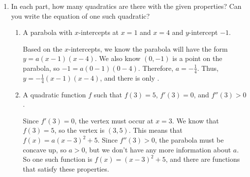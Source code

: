 \documentclass{article}
\begin{document}
\begin{enumerate}[resume]
\begin{enumerate}
    \begin{problem}[\stretch{0.35}]
      Can you rewrite $g(x)$ in the other 2 ways?
    \end{problem}

    \begin{solution}
      We can rewrite $g(x)$ in vertex form with 
      $a=-2$, $h=1$, and $k=-5$. So $g(x)=-2(x-1)^2-5$. However,
      we can see that the graph of $y=g(x)$ has no $x$-intercepts,
      which means that we cannot rewrite $g(x)$ in factored form
      using \textit{real numbers} $r_1$ and $r_2$. 
    \end{solution}
  \end{enumerate}


\item  In each part, how many quadratics are there with the given properties? Can you write the equation of one such quadratic?

  \begin{enumerate}
  \item


    \begin{problem}[\nstretch{0.65}]
      A parabola with $x$-intercepts at $x = 1$ and $x = 4$ and $y$-intercept $-1$. 
    \end{problem}

    \begin{solution}
      Based on the $x$-intercepts, we know the parabola will have the form $y = a (x - 1) (x - 4)$. We also know $(0, -1)$ is a point on the parabola, so $-1 = a (0-1)(0-4)$. Therefore, $a = - \frac{1}{4}$. Thus, $\boxed{y =  - \frac{1}{4} (x - 1) (x - 4)}$, and there is only .
    \end{solution}

  \item
    \begin{problem}[\vfill]
      A quadratic function $f$ such that $f(3) = 5$, $f'(3) = 0$, and $f''(3) > 0$. 
    \end{problem}

    \begin{solution}
      Since $f'(3)=0$, the vertex must occur at $x=3$. We know
      that $f(3)=5$, so the vertex is $(3, 5)$. This means
      that $f(x)=a(x-3)^2+5$. Since $f''(3)>0$, the parabola
      must be concave up, so $a>0$, but we don't have any
      more information about $a$. So one such function is
      $\boxed{f(x)=(x-3)^2+5}$, and there are  functions that satisfy these properties.
    \end{solution}


\end{enumerate}
\end{enumerate}
\end{document}
